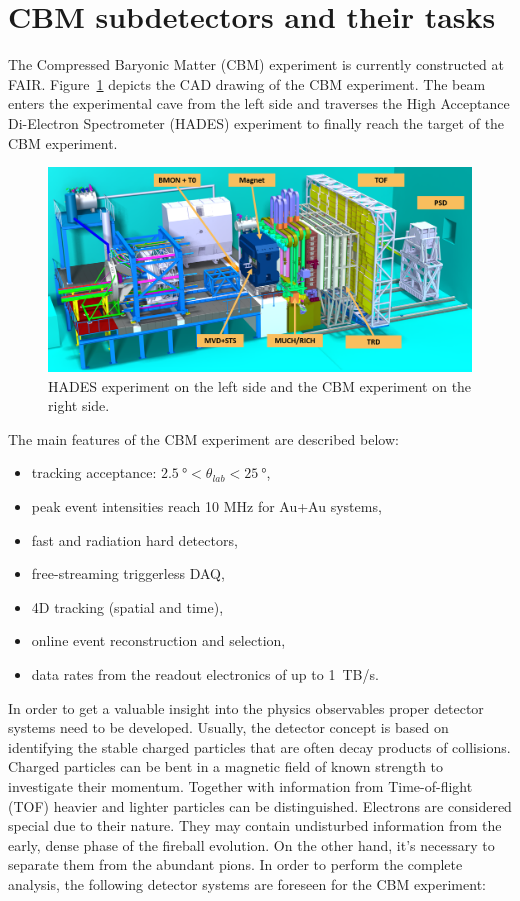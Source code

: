 

\section{CBM subdetectors and their tasks}
The Compressed Baryonic Matter (\gls{CBM}) experiment is currently constructed at \gls{FAIR}. Figure~\ref{fig:exp} depicts the CAD drawing of the \gls{CBM} experiment. The beam enters the experimental cave from the left side and traverses the High Acceptance Di-Electron Spectrometer (\gls{HADES}) experiment to finally reach the target of the \gls{CBM} experiment. 

\begin{figure}[!h]
    \centering
    \includegraphics[width=1\columnwidth]{Chapter1/images/CBMnew.png}
    \caption{HADES experiment on the left side and the \gls{CBM} experiment on the right side.}
    \label{fig:exp}
\end{figure}

The main features of the \gls{CBM} experiment are described below:
\begin{itemize}
\item tracking acceptance: $\SI{2.5}{\degree} < \theta_{lab} < \SI{25}{\degree}$,
\item peak event intensities reach 10 MHz for Au+Au systems,
\item fast and radiation hard detectors,
\item free-streaming triggerless \gls{DAQ},
\item 4D tracking (spatial and time),
\item online event reconstruction and selection,
\item data rates from the readout electronics of up to 1~TB/s.
\end{itemize}


In order to get a valuable insight into the physics observables proper detector systems need to be developed. Usually, the detector concept is based on identifying the stable charged particles that are often decay products of collisions. Charged particles can be bent in a magnetic field of known strength to investigate their momentum. Together with information from Time-of-flight (\gls{TOF}) heavier and lighter particles can be distinguished. Electrons are considered special due to their nature. They may contain undisturbed information from the early, dense phase of the fireball evolution. On the other hand, it's necessary to separate them from the abundant pions. In order to perform the complete analysis, the following detector systems are foreseen for the \gls{CBM} experiment:\bigbreak


